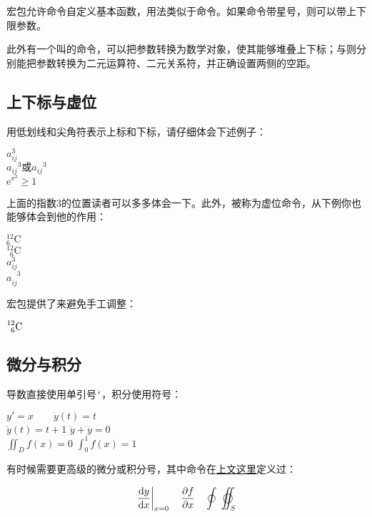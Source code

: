 宏包允许命令自定义基本函数，用法类似于命令。如果命令带星号，则可以带上下限参数。

此外有一个叫的命令，可以把参数转换为数学对象，使其能够堆叠上下标；与则分别能把参数转换为二元运算符、二元关系符，并正确设置两侧的空距。

\subsection{上下标与虚位}
用低划线和尖角符表示上标和下标，请仔细体会下述例子：

\begin{codeshow}
$a^3_{ij}$ \\
${a_{ij}}^3\text{或}a_{ij}{}^3$\\
$\mathrm{e}^{x^2}\geq 1$
\end{codeshow}

上面的指数3的位置读者可以多多体会一下。此外，被称为虚位命令，从下例你也能够体会到他的作用：

\begin{codeshow}
${}^{12}_{6}\mathrm{C}$ \\
${}^{12}_{\phantom{1}6}
\mathrm{C}$ \\
$a^3_{ij}$ \\
$a^{\phantom{ij}3}_{ij}$
\end{codeshow}

宏包提供了来避免手工调整：
\begin{codeshow}
$\prescript{12}{6}{\mathrm{C}}$
\end{codeshow}

\subsection{微分与积分}
导数直接使用单引号\verb|'|，积分使用符号：

\begin{codeshow}
$y'=x \qquad \dot{y}(t)=t$ \\
$\ddot{y}(t)=t+1$
$\dddot{y}+\ddddot{y}=0$ \\
$\iint_{D}f(x)=0$
$\int_{0}^{1}f(x)=1$
\end{codeshow}

有时候需要更高级的微分或积分号，其中命令在\hyperref[cmd:ud]{上文这里}定义过：
\begin{codeshow}
\[\left.\frac{\ud y}{\ud x}\right|_{x=0}\quad
\frac{\partial f}{\partial x}
\quad\oint\;\varoiint_S \]
\end{codeshow}

